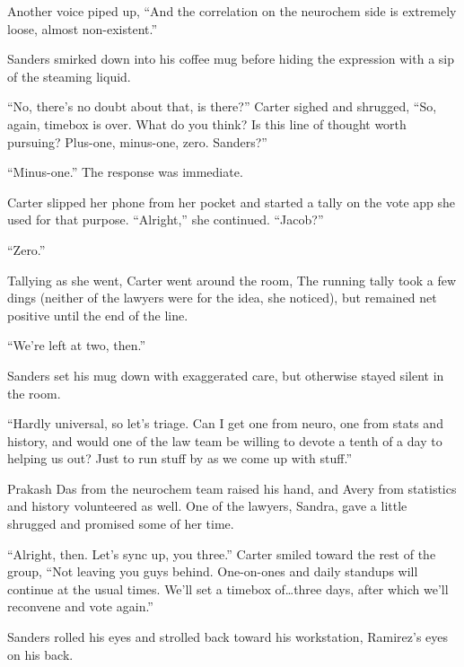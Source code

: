Another voice piped up, ``And the correlation on the neurochem side is extremely loose, almost non-existent.''

Sanders smirked down into his coffee mug before hiding the expression with a sip of the steaming liquid.

``No, there's no doubt about that, is there?'' Carter sighed and shrugged, ``So, again, timebox is over. What do you think? Is this line of thought worth pursuing? Plus-one, minus-one, zero. Sanders?''

``Minus-one.'' The response was immediate.

Carter slipped her phone from her pocket and started a tally on the vote app she used for that purpose. ``Alright,'' she continued. ``Jacob?''

``Zero.''

Tallying as she went, Carter went around the room, The running tally took a few dings (neither of the lawyers were for the idea, she noticed), but remained net positive until the end of the line.

``We're left at two, then.''

Sanders set his mug down with exaggerated care, but otherwise stayed silent in the room.

``Hardly universal, so let's triage. Can I get one from neuro, one from stats and history, and would one of the law team be willing to devote a tenth of a day to helping us out? Just to run stuff by as we come up with stuff.''

Prakash Das from the neurochem team raised his hand, and Avery from statistics and history volunteered as well. One of the lawyers, Sandra, gave a little shrugged and promised some of her time.

``Alright, then. Let's sync up, you three.'' Carter smiled toward the rest of the group, ``Not leaving you guys behind. One-on-ones and daily standups will continue at the usual times. We'll set a timebox of\ldots{}three days, after which we'll reconvene and vote again.''

Sanders rolled his eyes and strolled back toward his workstation, Ramirez's eyes on his back.
